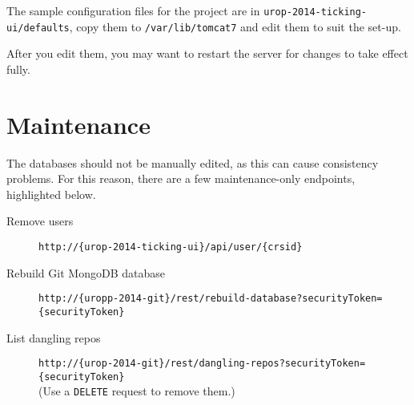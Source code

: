 \documentclass[12pt,a4paper]{article}
\newcommand{\tomcatwd}{{\tt /var/\hspace{0pt}lib/\hspace{0pt}tomcat7}}
\begin{document}
The sample configuration files for the project are in {\tt urop-2014-ticking-ui/defaults}, copy them to \tomcatwd{}{} and edit them to suit the set-up.

After you edit them, you may want to restart the server for changes to take effect fully.

\section{Maintenance}
The databases should not be manually edited, as this can cause consistency problems.
For this reason, there are a few maintenance-only endpoints, highlighted below.
\begin{description}
  \item[Remove users] {\tt http://\{urop-2014-ticking-ui\}/\hspace{0pt}api/\hspace{0pt}user/\hspace{0pt}\{crsid\}}
  \item[Rebuild Git MongoDB database] {\tt http://\{uropp-2014-git\}/\hspace{0pt}rest/\hspace{0pt}rebuild-database?\hspace{0pt}securityToken=\hspace{0pt}\{securityToken\}}
  \item[List dangling repos] {\tt http://\{urop-2014-git\}/\hspace{0pt}rest/\hspace{0pt}dangling-repos?\hspace{0pt}securityToken=\hspace{0pt}\{securityToken\}}\\
    (Use a {\tt DELETE} request to remove them.)
\end{description}
\end{document}

